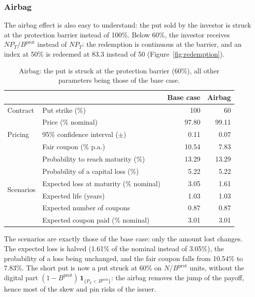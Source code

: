 \documentclass[11pt,a4paper]{article}
\newcommand{\ind}{\mathbf{1}}
\begin{document}
\clearpage
\subsubsection{Airbag}

The airbag effect is also easy to understand: the put sold by the investor is struck at the protection barrier
instead of 100\%. Below 60\%, the investor receives $N P_T / B^{\mathrm{prot}}$ instead of $N P_T$: the redemption
is continuous at the barrier, and an index at 50\% is redeemed at 83.3 instead of 50 (Figure~\ref{fig:redemption}).

\begin{table}[htbp]
  \centering
  \small
  \begin{tabular}{llrr}
    \toprule
     & & \textbf{Base case} & \textbf{Airbag} \\
    \midrule
    \multirow{1}{*}{Contract}
      & Put strike (\%) & 100 & 60 \\
    \midrule
    \multirow{3}{*}{Pricing}
      & Price (\% nominal) & 97.80 & 99.11 \\
      & 95\% confidence interval ($\pm$) & 0.11 & 0.07 \\
      & Fair coupon (\% p.a.) & 10.54 & 7.83 \\
    \midrule
    \multirow{6}{*}{Scenarios}
      & Probability to reach maturity (\%) & 13.29 & 13.29 \\
      & Probability of a capital loss (\%) & 5.22 & 5.22 \\
      & Expected loss at maturity (\% nominal) & 3.05 & 1.61 \\
      & Expected life (years) & 1.03 & 1.03 \\
      & Expected number of coupons & 0.87 & 0.87 \\
      & Expected coupon paid (\% nominal) & 3.01 & 3.01 \\
    \bottomrule
  \end{tabular}
  \caption{Airbag: the put is struck at the protection barrier (60\%), all other parameters being those of the base case.}
  \label{tab:athena-airbag}
\end{table}

The scenarios are exactly those of the base case: only the amount lost changes. The expected loss is halved (1.61\%
of the nominal instead of 3.05\%), the probability of a loss being unchanged, and the fair coupon falls from 10.54\%
to 7.83\%. The short put is now a put struck at 60\% on $N/B^{\mathrm{prot}}$ units, without the digital part
$(1 - B^{\mathrm{prot}})\,\ind_{\{P_T < B^{\mathrm{prot}}\}}$: the airbag removes the jump of the payoff, hence most
of the skew and pin risks of the issuer.
\end{document}
